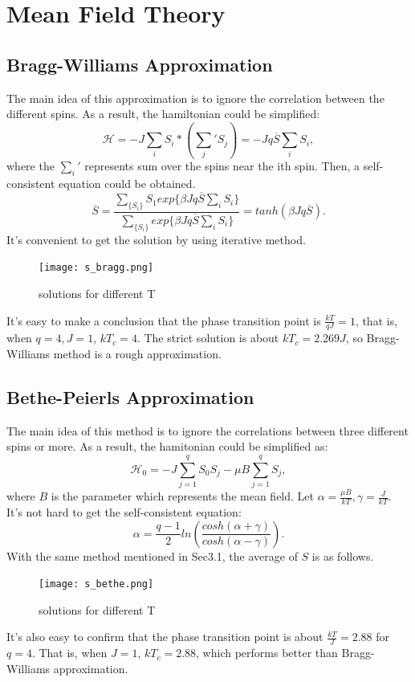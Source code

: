\documentclass[UTF-8]{article}
\begin{document}
\section{Mean Field Theory}
\subsection{Bragg-Williams Approximation}
The main idea of this approximation is to ignore the correlation between the different spins. As a result, the hamiltonian could be simplified:
\begin{equation}
\label{brag_h}
\mathcal{H}=-J\sum_{i}S_i*(\sum_{j}'S_j)=-Jq\overline{S}\sum_{i}S_i,
\end{equation}
where the $\sum_{i}'$ represents sum over the spins near the ith spin. Then, a self-consistent equation could be obtained.
\begin{equation}
\label{cons}
\overline{S}=\frac{\sum_{\{S_i\}}S_1exp\{\beta Jq\overline{S}\sum_{i}S_i\}}{\sum_{\{S_i\}}exp\{\beta Jq\overline{S}\sum_{i}S_i\}}=tanh(\beta Jq\overline{S}).
\end{equation}
It's convenient to get the solution by using iterative method.
\begin{figure}[H]
	\centering
	\texttt{[image: s\_bragg.png]}
	\caption{solutions for different T}
	\label{fig_1}
\end{figure}
It's easy to make a conclusion that the phase transition point is $\frac{kT}{qJ}=1$, that is, when $q=4,J=1$, $kT_c=4$. The strict solution is about $kT_c=2.269J$, so Bragg-Williams method is a rough approximation.

\subsection{Bethe-Peierls Approximation}
The main idea of this method is to ignore the correlations between three different spins or more. As a result, the hamitonian could be simplified as:
\begin{equation}
\label{bethe_h}
\mathcal{H}_0=-J\sum_{j=1}^{q}S_0S_j-\mu B\sum_{j=1}^{q}S_j,
\end{equation}
where $B$ is the parameter which represents the mean field. Let $\alpha=\frac{\mu B}{kT},\gamma=\frac{J}{kT}$. It's not hard to get the self-consistent equation:
\begin{equation}
\label{bethe_con}
\alpha=\frac{q-1}{2}ln(\frac{cosh(\alpha+\gamma)}{cosh(\alpha-\gamma)}).
\end{equation}
With the same method mentioned in Sec3.1, the average of $S$ is as follows.
\begin{figure}[H]
	\centering
	\texttt{[image: s\_bethe.png]}
	\caption{solutions for different T}
	\label{fig_2}
\end{figure}
It's also easy to confirm that the phase transition point is about $\frac{kT}{J}=2.88$ for $q=4$. That is, when $J=1$, $kT_c=2.88$, which performs better than Bragg-Williams approximation. 
\end{document}
